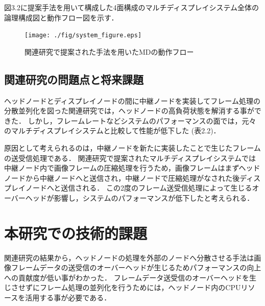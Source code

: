 図3.2に提案手法を用いて構成した4面構成のマルチディスプレイシステム全体の論理構成図と動作フロー図を示す．


\begin{figure}[H]
  \hspace*{\fill}
  \texttt{[image: ./fig/system\_figure.eps]}
  \hspace*{\fill}
  \caption{関連研究で提案された手法を用いたMDの動作フロー}
 \end{figure}

 \subsection*{関連研究の問題点と将来課題}
 ヘッドノードとディスプレイノードの間に中継ノードを実装してフレーム処理の分散並列化を図った関連研究では，ヘッドノードの高負荷状態を解消する事ができた．
 しかし，フレームレートなどシステムのパフォーマンスの面では，元々のマルチディスプレイシステムと比較して性能が低下した (表2.2)．

 \begin{table}
  \centering
  \caption{中継ノード実装によるフレームレートの比較}\label{tab1}
  \end{table}

 原因として考えられるのは，中継ノードを新たに実装したことで生じたフレームの送受信処理である．
 関連研究で提案されたマルチディスプレイシステムでは中継ノード内で画像フレームの圧縮処理を行うため，画像フレームはまずヘッドノードから中継ノードへと送信され，中継ノードで圧縮処理がなされた後ディスプレイノードへと送信される．
 この2度のフレーム送受信処理によって生じるオーバーヘッドが影響し，システムのパフォーマンスが低下したと考えられる．

 \section{本研究での技術的課題}
関連研究の結果から，ヘッドノードの処理を外部のノードへ分散させる手法は画像フレームデータの送受信のオーバーヘッドが生じるためパフォーマンスの向上への貢献度が低い事がわかった．
フレームデータ送受信のオーバーヘッドを生じさせずにフレーム処理の並列化を行うためには，ヘッドノード内のCPUリソースを活用する事が必要である．

